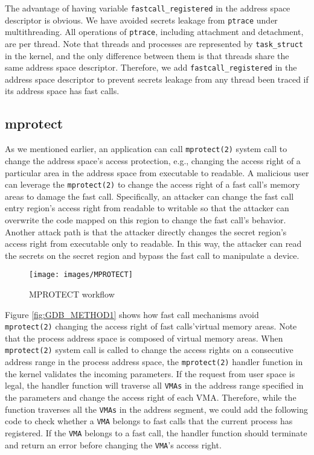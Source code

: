  The advantage of having variable \verb|fastcall_registered| in the address space 
 descriptor is obvious.  We have avoided secrets leakage from \verb|ptrace| under 
 multithreading. All operations of \verb|ptrace|, including attachment and detachment, 
 are per thread. Note that threads and processes are represented by \verb|task_struct|
 in the kernel, and the only difference between them is that threads share 
the same address space descriptor. Therefore, we add \verb|fastcall_registered| 
in the address space descriptor to prevent secrets leakage from any thread 
been traced if its address space has fast calls.

\subsection{mprotect}
As we mentioned earlier, an application can call \verb|mprotect(2)|  
system call to change the address space's access protection, 
e.g., changing the access right of a particular area in the address 
space from executable to readable.  A malicious user can leverage the 
\verb|mprotect(2)| to change the access right of a fast call's memory areas to 
damage the fast call. Specifically, an attacker can change the fast 
call entry region's access right from readable to writable so that the attacker can overwrite 
the code mapped on this region to change the fast call's behavior. 
Another attack path is that the attacker directly changes the secret 
region's access right from executable only to readable. In this way, 
the attacker can read the secrets on the secret region and bypass the 
fast call to manipulate a device.
\begin{figure}[H]
  \centering
  \texttt{[image: images/MPROTECT]}
  \caption[Short description]{MPROTECT workflow}
  \label{fig:MPROTECT}
\end{figure}

Figure \ref{fig:GDB_METHOD1} shows how fast call mechanisms avoid \verb|mprotect(2)| 
changing the access right of fast calls'virtual memory areas. 
Note that the process address space is composed of virtual memory areas.  
When \verb|mprotect(2)| system call is called to change the access rights on a 
consecutive address range in the process address space, the \verb|mprotect(2)| 
handler function in the kernel validates the incoming parameters. 
If the request from user space is legal, the handler function will 
traverse all \verb|VMAs| in the address range specified in the parameters
 and change the access right of each VMA. Therefore, while the function 
 traverses all the \verb|VMAs| in the address segment, we could add the following 
 code to check whether a \verb|VMA| belongs to fast calls that the current process 
 has registered. If the \verb|VMA| belongs to a fast call, the handler function 
 should terminate and return an error before changing the \verb|VMA|'s access right.

